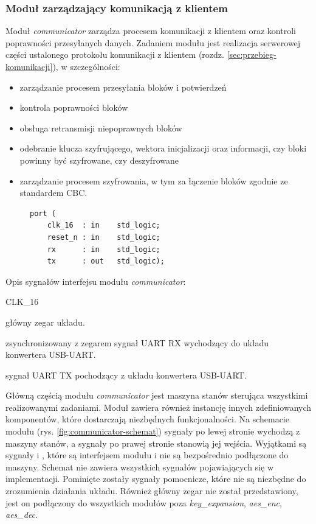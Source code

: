 \subsubsection{Moduł zarządzający komunikacją z klientem}
Moduł \textit{communicator} zarządza procesem komunikacji z klientem oraz kontroli poprawności przesyłanych danych. Zadaniem modułu jest realizacja serwerowej części ustalonego protokołu komunikacji z klientem (rozdz. \ref{sec:przebieg-komunikacji}), w szczególności:
\begin{itemize}[noitemsep, nolistsep]
\item zarządzanie procesem przesyłania bloków i potwierdzeń
\item kontrola poprawności bloków
\item obsługa retransmisji niepoprawnych bloków
\item odebranie klucza szyfrującego, wektora inicjalizacji oraz informacji, czy bloki powinny być szyfrowane, czy deszyfrowane
\item zarządzanie procesem szyfrowania, w tym za łączenie bloków zgodnie ze standardem CBC.
\end{itemize}

\begin{figure}[!h]
\begin{lstlisting}[style=vhdl, captionpos=b, caption={\textit{communicator} -- interfejs modułu}]
port (
	clk_16  : in    std_logic;
	reset_n : in    std_logic;
	rx      : in    std_logic;
	tx      : out   std_logic);
\end{lstlisting}
\end{figure}

Opis sygnałów interfejsu modułu \textit{communicator}:
\begin{interface}{CLK\_16}
	\item[\insignal{CLK\_16}] główny zegar układu.
	\item[\insignal{RX}] zsynchronizowany z zegarem  sygnał UART RX wychodzący do układu konwertera USB-UART.
	\item[\outsignal{TX}] sygnał UART TX pochodzący z układu konwertera USB-UART.
\end{interface}

Główną częścią modułu \textit{communicator} jest maszyna stanów sterująca wszystkimi realizowanymi zadaniami. Moduł zawiera również instancję innych zdefiniowanych komponentów, które dostarczają niezbędnych funkcjonalności. Na schemacie modułu (rys. \ref{fig:communicator-schemat}) sygnały po lewej stronie wychodzą z maszyny stanów, a sygnały po prawej stronie stanowią jej wejścia. Wyjątkami są sygnały  i , które są interfejsem modułu i nie są bezpośrednio podłączone do maszyny. Schemat nie zawiera wszystkich sygnałów pojawiających się w implementacji. Pominięte zostały sygnały pomocnicze, które nie są niezbędne do zrozumienia działania układu. Również główny zegar nie został przedstawiony, jest on podłączony do wszystkich modułów poza \textit{key\_expansion}, \textit{aes\_enc}, \textit{aes\_dec}.

